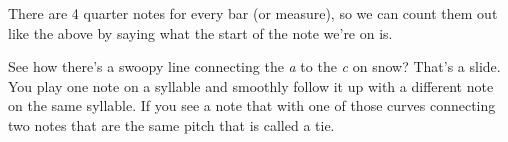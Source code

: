 \documentclass[12pt]{article}
\begin{document}
{%
\parindent 0pt
\noindent
\ifx\preLilyPondExample \undefined
\else
  \expandafter\preLilyPondExample
\fi
\def\lilypondbook{}%

\ifx\postLilyPondExample \undefined
\else
  \expandafter\postLilyPondExample
\fi
}

There are 4 quarter notes for every bar (or measure), so we can count them out like the above by saying what the start of the note we're on is.


{%
\parindent 0pt
\noindent
\ifx\preLilyPondExample \undefined
\else
  \expandafter\preLilyPondExample
\fi
\def\lilypondbook{}%

\ifx\postLilyPondExample \undefined
\else
  \expandafter\postLilyPondExample
\fi
}

See how there's a swoopy line connecting the \emph{a} to the \emph{c} on snow? That's a slide. You play one note on a syllable and smoothly follow it up with a different note on the same syllable. If you see a note that with one of those curves connecting two notes that are the same pitch that is called a tie.
\end{document}

